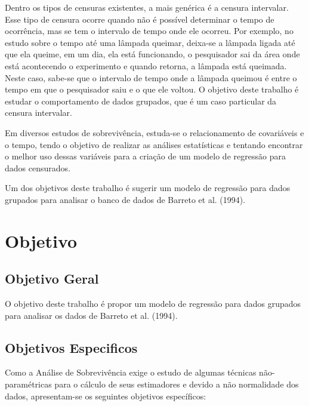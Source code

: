 \documentclass[a4paper,12pt]{article}
\begin{document}
Dentro os tipos de censuras existentes, a mais genérica é a censura intervalar. Esse tipo de censura ocorre quando não é possível determinar o tempo de ocorrência, mas se tem o intervalo de tempo onde ele ocorreu. Por exemplo, no estudo sobre o tempo até uma lâmpada queimar, deixa-se a lâmpada ligada até que ela queime, em um dia, ela está funcionando, o pesquisador sai da área onde está acontecendo o experimento e quando retorna, a lâmpada está queimada. Neste caso, sabe-se que o intervalo de tempo onde a lâmpada queimou é entre o tempo em que o pesquisador saiu e o que ele voltou. O objetivo deste trabalho é estudar o comportamento de dados grupados, que é um caso particular da censura intervalar.

Em diversos estudos de sobrevivência, estuda-se o relacionamento de covariáveis e o tempo, tendo o objetivo de realizar as análises estatísticas e tentando encontrar o melhor uso dessas variáveis para a criação de um modelo de regressão para dados censurados.

Um dos objetivos deste trabalho é sugerir um modelo de regressão para dados grupados para analisar o banco de dados de Barreto et al. (1994).



\section{Objetivo}
\noindent

\subsection{Objetivo Geral}

O objetivo deste trabalho é propor um modelo de regressão para dados grupados para analisar os dados de Barreto et al. (1994).

\subsection{Objetivos Especificos}

Como a Análise de Sobrevivência exige o estudo de algumas técnicas não-paramétricas para o cálculo de seus estimadores e devido a não normalidade dos dados, apresentam-se os seguintes objetivos específicos:
\end{document}
